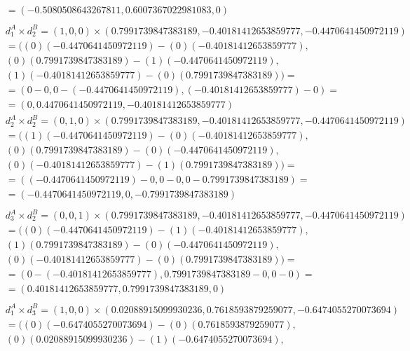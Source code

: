 \documentclass[a4paper]{article}
\begin{document}
\begin{align*}
		\\
		&=(-0.5080508643267811, 0.6007367022981083, 0)
		\\
		\\
		&d_1^A \times d_2^B = (1, 0, 0) \times (0.7991739847383189, -0.40181412653859777, -0.4470641450972119)
		\\
		&= ((0) (-0.4470641450972119) - (0) (-0.40181412653859777), 
		\\
		&(0) (0.7991739847383189) - (1) (-0.4470641450972119), 
		\\
		&(1) (-0.40181412653859777) - (0) (0.7991739847383189)) =
		\\
		&=(0-0, 0-(-0.4470641450972119), (-0.40181412653859777)-0)=
		\\
		&=(0, 0.4470641450972119, -0.40181412653859777)
	\end{align*}
	\begin{align*}
		&d_2^A \times d_2^B = (0, 1, 0) \times (0.7991739847383189, -0.40181412653859777, -0.4470641450972119)
		\\
		&= ((1) (-0.4470641450972119) - (0) (-0.40181412653859777), 
		\\
		&(0) (0.7991739847383189) - (0) (-0.4470641450972119), 
		\\
		&(0) (-0.40181412653859777) - (1) (0.7991739847383189)) =
		\\
		&=((-0.4470641450972119)-0, 0-0, 0-0.7991739847383189)=
		\\
		&=(-0.4470641450972119, 0, -0.7991739847383189)
		\\
		\\
		&d_3^A \times d_2^B = (0, 0, 1) \times (0.7991739847383189, -0.40181412653859777, -0.4470641450972119)
		\\
		&= ((0) (-0.4470641450972119) - (1) (-0.40181412653859777), 
		\\
		&(1) (0.7991739847383189) - (0) (-0.4470641450972119), 
		\\
		&(0) (-0.40181412653859777) - (0) (0.7991739847383189)) =
		\\
		&=(0-(-0.40181412653859777), 0.7991739847383189-0, 0-0)=
		\\
		&=(0.40181412653859777, 0.7991739847383189, 0)
		\\
		\\
		&d_1^A \times d_3^B = (1, 0, 0) \times (0.02088915099930236, 0.7618593879259077, -0.6474055270073694)
		\\
		&= ((0) (-0.6474055270073694) - (0) (0.7618593879259077), 
		\\
		&(0) (0.02088915099930236) - (1) (-0.6474055270073694), 

\end{align*}
\end{document}
